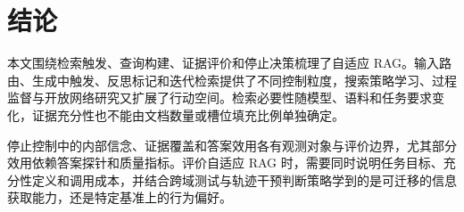 \section{结论}
\label{sec:conclusion}

本文围绕检索触发、查询构建、证据评价和停止决策梳理了自适应 RAG。输入路由、生成中触发、反思标记和迭代检索提供了不同控制粒度，搜索策略学习、过程监督与开放网络研究又扩展了行动空间。检索必要性随模型、语料和任务要求变化，证据充分性也不能由文档数量或槽位填充比例单独确定。

停止控制中的内部信念、证据覆盖和答案效用各有观测对象与评价边界，尤其部分效用依赖答案探针和质量指标。评价自适应 RAG 时，需要同时说明任务目标、充分性定义和调用成本，并结合跨域测试与轨迹干预判断策略学到的是可迁移的信息获取能力，还是特定基准上的行为偏好。

